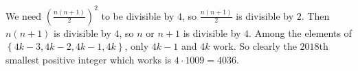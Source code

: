 We need $\left(\frac{n\left(n+1\right)}{2}\right)^2$ to be divisible by $4$, so $\frac{n\left(n+1\right)}{2}$ is divisible by $2$. Then $n\left(n+1\right)$ is divisible by $4$, so $n$ or $n+1$ is divisible by $4$. Among the elements of $\left\{4k-3,4k-2,4k-1,4k\right\}$, only $4k-1$ and $4k$ work. So clearly the $2018$th smallest positive integer which works is $4\cdot1009=\boxed{4036}$.